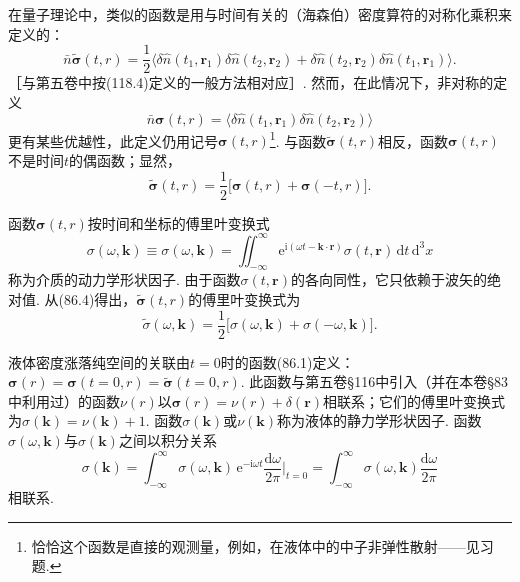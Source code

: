 在量子理论中，类似的函数是用与时间有关的（海森伯）密度算符的对称化乘积来定义的：
\begin{equation}
\bar{n}\tilde{\bm{\sigma}}(t,r)=\frac{1}{2}\bigl\langle\delta\hat{n}(t_{1},\bm{r}_{1})\delta\hat{n}(t_{2},\bm{r}_{2})+\delta\hat{n}(t_{2},\bm{r}_{2})\delta\hat{n}(t_{1},\bm{r}_{1})\bigr\rangle.
\end{equation}
［与第五卷中按(118.4)定义的一般方法相对应］. 然而，在此情况下，非对称的定义
\begin{equation}
\bar{n}\bm{\sigma}(t,r)=\bigl\langle\delta\hat{n}(t_{1},\bm{r}_{1})\delta\hat{n}(t_{2},\bm{r}_{2})\bigr\rangle
\end{equation}
更有某些优越性，此定义仍用记号$\bm{\sigma}(t,r)$\footnote{恰恰这个函数是直接的观测量，例如，在液体中的中子非弹性散射——见习题.}. 与函数$\tilde{\bm{\sigma}}(t,r)$相反，函数$\bm{\sigma}(t,r)$不是时间$t$的偶函数；显然，
\begin{equation}
\tilde{\bm{\sigma}}(t,r)=\frac{1}{2}\bigl[\bm{\sigma}(t,r)+\bm{\sigma}(-t,r)\bigr].
\end{equation}

函数$\bm{\sigma}(t,r)$按时间和坐标的傅里叶变换式
\begin{equation}
\sigma(\omega,\bm{k})\equiv\sigma(\omega,\bm{k})=\iint_{-\infty}^{\infty}\mathrm{e}^{\mathrm{i}(\omega t-\bm{k}\cdot\bm{r})}\sigma(t,\bm{r})\,\mathrm{d}t\,\mathrm{d}^{3}x
\end{equation}
称为介质的动力学形状因子. 由于函数$\sigma(t,\bm{r})$的各向同性，它只依赖于波矢的绝对值. 从(86.4)得出，$\tilde{\bm{\sigma}}(t,r)$的傅里叶变换式为
\begin{equation}
\tilde{\sigma}(\omega,\bm{k})=\frac{1}{2}\bigl[\sigma(\omega,\bm{k})+\sigma(-\omega,\bm{k})\bigr].
\end{equation}

液体密度涨落纯空间的关联由$t=0$时的函数(86.1)定义：$\bm{\sigma}(r)=\bm{\sigma}(t=0,r)=\tilde{\bm{\sigma}}(t=0,r)$. 此函数与第五卷§116中引入（并在本卷§83中利用过）的函数$\nu(r)$以$\bm{\sigma}(r)=\nu(r)+\delta(\bm{r})$相联系；它们的傅里叶变换式为$\sigma(\bm{k})=\nu(\bm{k})+1$. 函数$\sigma(\bm{k})$或$\nu(\bm{k})$称为液体的静力学形状因子. 函数$\sigma(\omega,\bm{k})$与$\sigma(\bm{k})$之间以积分关系
\begin{equation}
\sigma(\bm{k})=\int_{-\infty}^{\infty}\sigma(\omega,\bm{k})\,\mathrm{e}^{-\mathrm{i}\omega t}\frac{\mathrm{d}\omega}{2\pi}\bigg|_{t=0}=\int_{-\infty}^{\infty}\sigma(\omega,\bm{k})\frac{\mathrm{d}\omega}{2\pi}
\end{equation}
相联系.

